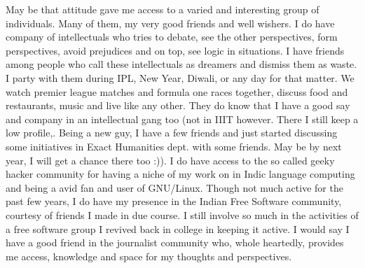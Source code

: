 May be that attitude gave me access to a varied and interesting group of individuals. Many of them, 
my very good friends and well wishers. I do have company of intellectuals who tries to debate, see 
the other perspectives, form perspectives, avoid prejudices and on top, see logic in situations. I 
have friends among people who call these intellectuals as dreamers and dismiss them as waste. I party 
with them during IPL, New Year, Diwali, or any day for that matter. We watch premier league matches 
and formula one races together, discuss food and restaurants, music and live like any other. They do 
know that I have a good say and company in an intellectual gang too (not in IIIT however. There I still keep a low
profile,. Being a new guy, I have a few friends and just started discussing some initiatives in Exact
Humanities dept. with some friends. May be by next year, I will get a chance there too :)). I do 
have access to the so called geeky hacker community for having a niche of my work on in Indic 
language computing and being a avid fan and user of GNU/Linux. Though not much active for the past 
few years, I do have my presence in the Indian Free Software community, courtesy of friends I made in 
due course. I still involve so much in the activities of a free software group I revived back in 
college in keeping it active. I would say I have a good friend in the journalist community who, whole
heartedly, provides me access, knowledge and space for my thoughts and perspectives.  


